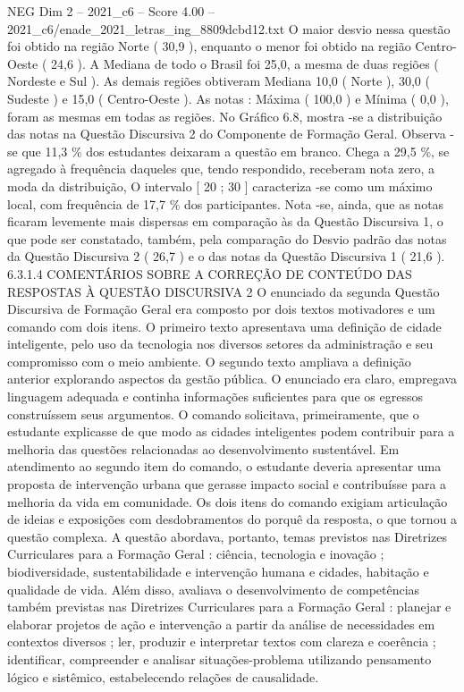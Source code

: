 \begin{textsample}{NEG Dim 2 – 2021\_c6 – Score 4.00 – 2021\_c6/enade\_2021\_letras\_ing\_8809dcbd12.txt}
O maior desvio nessa questão foi obtido na região Norte ( 30,9 ), enquanto o menor foi obtido na região Centro-Oeste ( 24,6 ).
A Mediana de todo o Brasil foi 25,0, a mesma de duas regiões ( Nordeste e Sul ).
As demais regiões obtiveram Mediana 10,0 ( Norte ), 30,0 ( Sudeste ) e 15,0 ( Centro-Oeste ).
As notas : Máxima ( 100,0 ) e Mínima ( 0,0 ), foram as mesmas em todas as regiões.
No Gráfico 6.8, mostra -se a distribuição das notas na Questão Discursiva 2 do Componente de Formação Geral.
Observa -se que 11,3 \% dos estudantes deixaram a questão em branco.
Chega a 29,5 \%, se agregado à frequência daqueles que, tendo respondido, receberam nota zero, a moda da distribuição, O intervalo [ 20 ; 30 ] caracteriza -se como um máximo local, com frequência de 17,7 \% dos participantes.
Nota -se, ainda, que as notas ficaram levemente mais dispersas em comparação às da Questão Discursiva 1, o que pode ser constatado, também, pela comparação do Desvio padrão das notas da Questão Discursiva 2 ( 26,7 ) e o das notas da Questão Discursiva 1 ( 21,6 ). 6.3.1.4 COMENTÁRIOS SOBRE A CORREÇÃO DE CONTEÚDO DAS RESPOSTAS À QUESTÃO DISCURSIVA 2 O enunciado da segunda Questão Discursiva de Formação Geral era composto por dois textos motivadores e um comando com dois itens.
O primeiro texto apresentava uma definição de cidade inteligente, pelo uso da tecnologia nos diversos setores da administração e seu compromisso com o meio ambiente.
O segundo texto ampliava a definição anterior explorando aspectos da gestão pública.
O enunciado era claro, empregava linguagem adequada e continha informações suficientes para que os egressos construíssem seus argumentos.
O comando solicitava, primeiramente, que o estudante explicasse de que modo as cidades inteligentes podem contribuir para a melhoria das questões relacionadas ao desenvolvimento sustentável.
Em atendimento ao segundo item do comando, o estudante deveria apresentar uma proposta de intervenção urbana que gerasse impacto social e contribuísse para a melhoria da vida em comunidade.
Os dois itens do comando exigiam articulação de ideias e exposições com desdobramentos do porquê da resposta, o que tornou a questão complexa.
A questão abordava, portanto, temas previstos nas Diretrizes Curriculares para a Formação Geral : ciência, tecnologia e inovação ; biodiversidade, sustentabilidade e intervenção humana e cidades, habitação e qualidade de vida.
Além disso, avaliava o desenvolvimento de competências também previstas nas Diretrizes Curriculares para a Formação Geral : planejar e elaborar projetos de ação e intervenção a partir da análise de necessidades em contextos diversos ; ler, produzir e interpretar textos com clareza e coerência ; identificar, compreender e analisar situações-problema utilizando pensamento lógico e sistêmico, estabelecendo relações de causalidade.

\end{textsample}

